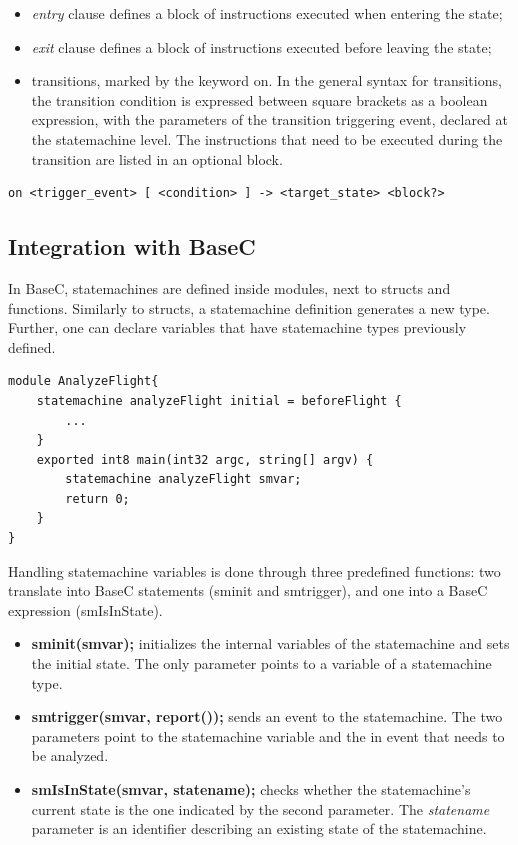 \documentclass[a4paper,10pt,titlepage]{report}
\begin{document}
\begin{itemize}
\item \emph{entry} clause defines a block of instructions executed when entering the state;
\item \emph{exit} clause defines a block of instructions executed before leaving the state;
\item transitions, marked by the keyword on. In the general syntax for transitions, the transition condition is expressed between square brackets as a boolean expression, with the parameters of the transition triggering event, declared at the statemachine level. The instructions that need to be executed during the transition are listed in an optional block.
\end{itemize}
 
\begin{lstlisting}
on <trigger_event> [ <condition> ] -> <target_state> <block?>
\end{lstlisting}

\subsection{Integration with BaseC}
In BaseC, statemachines are defined inside modules, next to structs and functions. Similarly to structs, a statemachine definition generates a new type. Further, one can declare variables that have statemachine types previously defined.

\begin{lstlisting}
module AnalyzeFlight{
    statemachine analyzeFlight initial = beforeFlight {
        ...
    }
    exported int8 main(int32 argc, string[] argv) {	  
        statemachine analyzeFlight smvar;
        return 0;
    }	
}
\end{lstlisting}

Handling statemachine variables is done through three predefined functions: two translate into BaseC statements (sminit and smtrigger), and one into a BaseC expression (smIsInState).

\begin{itemize}
\item \textbf{sminit(smvar);} initializes the internal variables of the statemachine and sets the initial state. The only parameter points to a variable of a statemachine type.

\item \textbf{smtrigger(smvar, report());} sends an event to the statemachine. The two parameters point to the statemachine variable and the in event that needs to be analyzed.

\item \textbf{smIsInState(smvar, statename);} checks whether the statemachine’s current state is the one indicated by the second parameter. The \emph{statename} parameter is an identifier describing an existing state of the statemachine.
\end{itemize}
\end{document}
